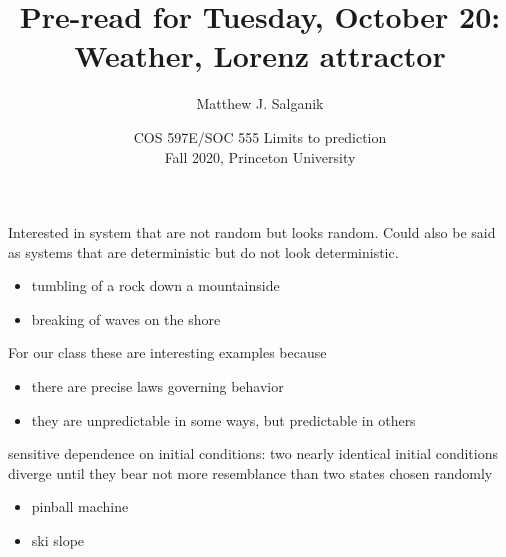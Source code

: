 \documentclass[aspectratio=169]{beamer}
\title[]{Pre-read for Tuesday, October 20:\\Weather, Lorenz attractor}
\author[]{Matthew J. Salganik}
\institute[]{}
\date[]{COS 597E/SOC 555 Limits to prediction\\Fall 2020, Princeton University}
\begin{document}
\frame{\titlepage}
\begin{frame}
\frametitle{}

Interested in system that are not random but looks random.  Could also be said as systems that are deterministic but do not look deterministic.
\pause
\begin{itemize}
\item tumbling of a rock down a mountainside
\item breaking of waves on the shore
\end{itemize}

\pause
For our class these are interesting examples because
\begin{itemize}
\item there are precise laws governing behavior
\item they are unpredictable in some ways, but predictable in others
\end{itemize}

\end{frame}
\begin{frame}

sensitive dependence on initial conditions: two nearly identical initial conditions diverge until they bear not more resemblance than two states chosen randomly

\pause
\begin{itemize}
\item pinball machine
\pause
\item ski slope
\end{itemize}

\end{frame}
\end{document}
